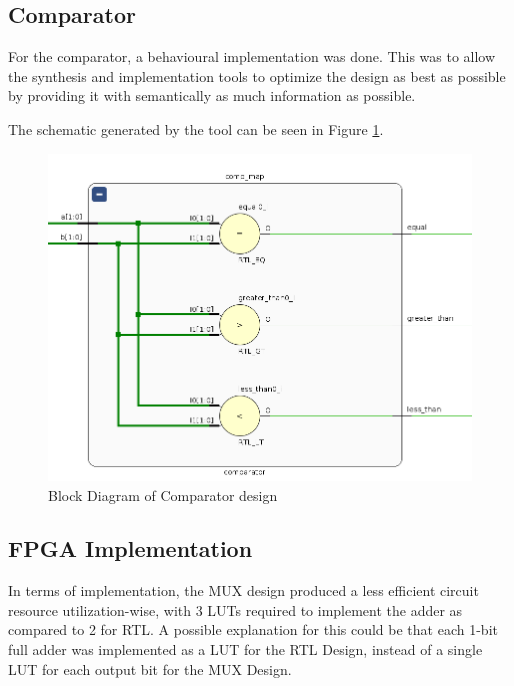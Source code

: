 \documentclass[12pt]{article}
\begin{document}
\subsection{Comparator}

For the comparator, a behavioural implementation was done. This was to allow the synthesis and implementation tools to
optimize the design as best as possible by providing it with semantically as much information as possible.

The schematic generated by the tool can be seen in Figure \ref{fig:comp-schematic}.

\begin{figure}[h]
    \centering
    \includegraphics[width=0.5\linewidth]{comp-schematic.png}
    \caption{Block Diagram of Comparator design}
    \label{fig:comp-schematic}
\end{figure}

\pagebreak

\subsection{FPGA Implementation}

In terms of implementation, the MUX design produced a less efficient circuit resource utilization-wise,
with 3 LUTs required to implement the adder as compared to 2 for RTL.
A possible explanation for this could be that each 1-bit full adder was implemented as a LUT for the RTL Design,
instead of a single LUT for each output bit for the MUX Design.
\end{document}
